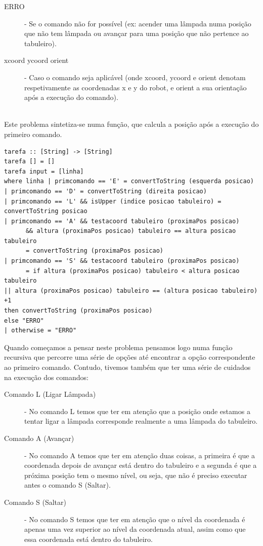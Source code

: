 \documentclass[a4paper,12pt,portuges]{article}
\begin{document}
\begin{description}
\item[ERRO] - Se o comando não for possível (ex: acender uma lâmpada numa posição que não tem lâmpada ou avançar para uma posição que não pertence ao tabuleiro).\\
\item[xcoord ycoord orient] - Caso o comando seja aplicável (onde xcoord, ycoord e orient denotam respetivamente as coordenadas x e y do robot, e orient a sua orientação após a execução do comando).
\end{description}
\\

Este problema sintetiza-se numa função, que calcula a posição após a execução do primeiro comando.

\begin{verbatim}
tarefa :: [String] -> [String]
tarefa [] = []
tarefa input = [linha]
where linha | primcomando == 'E' = convertToString (esquerda posicao)
| primcomando == 'D' = convertToString (direita posicao)
| primcomando == 'L' && isUpper (indice posicao tabuleiro) = convertToString posicao
| primcomando == 'A' && testacoord tabuleiro (proximaPos posicao)
      && altura (proximaPos posicao) tabuleiro == altura posicao tabuleiro
      = convertToString (proximaPos posicao)
| primcomando == 'S' && testacoord tabuleiro (proximaPos posicao)
      = if altura (proximaPos posicao) tabuleiro < altura posicao tabuleiro 
|| altura (proximaPos posicao) tabuleiro == (altura posicao tabuleiro) +1
then convertToString (proximaPos posicao)
else "ERRO"
| otherwise = "ERRO"
\end{verbatim}

Quando começamos a pensar neste problema pensamos logo numa função recursiva que percorre uma série de opções até encontrar a opção correspondente ao primeiro comando. Contudo, tivemos também que ter uma série de cuidados na execução dos comandos:\\
\begin{description}
\item[Comando L (Ligar Lâmpada)] - No comando L temos que ter em atenção que a posição onde estamos a tentar ligar a lâmpada corresponde realmente a uma lâmpada do tabuleiro.\\
\item[Comando A (Avançar)]- No comando A temos que ter em atenção duas coisas, a primeira é que a coordenada depois de avançar está dentro do tabuleiro e a segunda é que a próxima posição tem o mesmo nível, ou seja, que não é preciso executar antes o comando S (Saltar).\\
\item[Comando S (Saltar)] - No comando S temos que ter em atenção que o nível da coordenada é apenas uma vez superior ao nível da coordenada atual, assim como que essa coordenada está dentro do tabuleiro.\\
\end{description}
\end{document}
